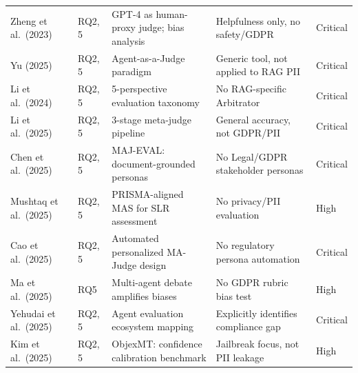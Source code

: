 \documentclass[12pt, a4paper]{report}
\begin{document}
\begin{small}
\begin{longtable}{L{3cm} C{1.2cm} L{3.5cm} L{3.5cm} C{1.5cm}}
Zheng et al.\ (2023) & RQ2, 5 & GPT-4 as human-proxy judge; bias analysis & Helpfulness only, no safety/GDPR & Critical \\
Yu (2025) & RQ2, 5 & Agent-as-a-Judge paradigm & Generic tool, not applied to RAG PII & Critical \\
Li et al.\ (2024) & RQ2, 5 & 5-perspective evaluation taxonomy & No RAG-specific Arbitrator & Critical \\
Li et al.\ (2025) & RQ2, 5 & 3-stage meta-judge pipeline & General accuracy, not GDPR/PII & Critical \\
Chen et al.\ (2025) & RQ2, 5 & MAJ-EVAL: document-grounded personas & No Legal/GDPR stakeholder personas & Critical \\
Mushtaq et al.\ (2025) & RQ2, 5 & PRISMA-aligned MAS for SLR assessment & No privacy/PII evaluation & High \\
Cao et al.\ (2025) & RQ2, 5 & Automated personalized MA-Judge design & No regulatory persona automation & Critical \\
Ma et al.\ (2025) & RQ5 & Multi-agent debate amplifies biases & No GDPR rubric bias test & High \\
Yehudai et al.\ (2025) & RQ2, 5 & Agent evaluation ecosystem mapping & Explicitly identifies compliance gap & Critical \\
Kim et al.\ (2025) & RQ2, 5 & ObjexMT: confidence calibration benchmark & Jailbreak focus, not PII leakage & High \\

\end{longtable}
\end{small}

\clearpage
\renewcommand{\thechapter}{\arabic{chapter}}
\renewcommand{\thesection}{\thechapter.\arabic{section}}
\setcounter{chapter}{0}
\setcounter{section}{0}
\setlength{\parskip}{5pt}
\end{document}
